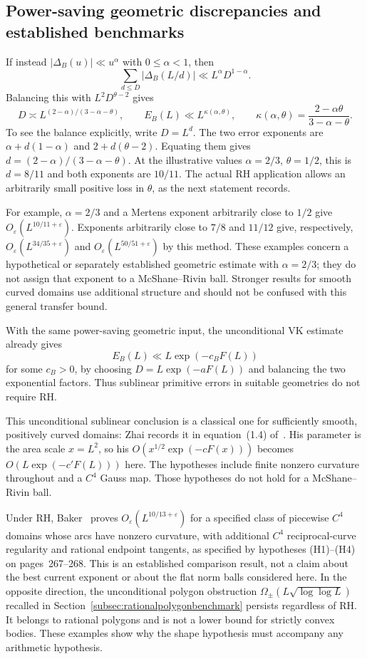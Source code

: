 \subsection{Power-saving geometric discrepancies and established benchmarks}
If instead $|\Delta_B(u)|\ll u^\alpha$ with $0\le\alpha<1$, then
\[
 \sum_{d\le D}|\Delta_B(L/d)|\ll L^\alpha D^{1-\alpha}.
\]
Balancing this with $L^2D^{\theta-2}$ gives
\begin{equation}\label{eq:primitiveRHbalancedpower}
 D\asymp L^{(2-\alpha)/(3-\alpha-\theta)},\qquad
 E_B(L)\ll L^{\kappa(\alpha,\theta)},\qquad
 \kappa(\alpha,\theta)=\frac{2-\alpha\theta}{3-\alpha-\theta}.
\end{equation}
To see the balance explicitly, write $D=L^d$. The two error
exponents are $\alpha+d(1-\alpha)$ and $2+d(\theta-2)$.
Equating them gives $d=(2-\alpha)/(3-\alpha-\theta)$.
At the illustrative values $\alpha=2/3$, $\theta=1/2$,
this is $d=8/11$ and both exponents are $10/11$.
The actual RH application allows an arbitrarily small positive
loss in $\theta$, as the next statement records.

For example, $\alpha=2/3$ and a Mertens exponent arbitrarily close
to $1/2$ give $O_\varepsilon(L^{10/11+\varepsilon})$.
Exponents arbitrarily close to $7/8$ and $11/12$ give, respectively,
$O_\varepsilon(L^{34/35+\varepsilon})$ and
$O_\varepsilon(L^{50/51+\varepsilon})$ by this method.
These examples concern a hypothetical or separately established
geometric estimate with $\alpha=2/3$; they do not assign that exponent
to a McShane--Rivin ball.  Stronger results for smooth curved domains
use additional structure and should not be confused with this general
transfer bound.

With the same power-saving geometric input, the unconditional VK
estimate already gives
\[
 E_B(L)\ll L\exp(-c_B F(L))
\]
for some $c_B>0$, by choosing
$D=L\exp(-aF(L))$ and balancing the two exponential factors.
Thus sublinear primitive errors in suitable geometries do not require RH.


This unconditional sublinear conclusion is a classical one for
sufficiently smooth, positively curved domains: Zhai records it in
equation~(1.4) of~\cite{ZhaiPrimitive2003}. His parameter is the area
scale $x=L^2$, so his $O(x^{1/2}\exp(-cF(x)))$ becomes
$O(L\exp(-c'F(L)))$ here. The hypotheses include finite nonzero
curvature throughout and a $C^4$ Gauss map. Those hypotheses do not
hold for a McShane--Rivin ball.

Under RH, Baker~\cite[Theorem~1]{BakerPrimitive2010} proves
$O_\varepsilon(L^{10/13+\varepsilon})$ for a specified class of
piecewise $C^4$ domains whose arcs have nonzero curvature, with
additional $C^4$ reciprocal-curve regularity and rational endpoint
tangents, as specified by hypotheses (H1)--(H4) on pages~267--268.
This is an established comparison result, not a claim about the best
current exponent or about the flat norm balls considered here.
In the opposite direction, the unconditional polygon obstruction
$\Omega_\pm(L\sqrt{\log\log L})$ recalled in
Section~\ref{subsec:rationalpolygonbenchmark} persists regardless of RH.
It belongs to rational polygons and is not a lower bound for strictly
convex bodies. These examples show why the shape hypothesis must
accompany any arithmetic hypothesis.

